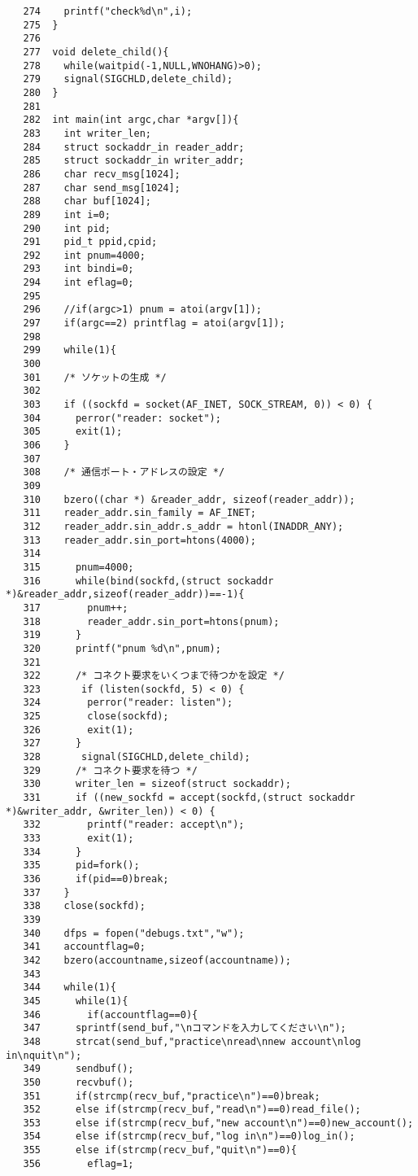 \documentclass[a4j]{jarticle}
\begin{document}
{\begin{verbatim}
   274	  printf("check%d\n",i);
   275	}
   276	
   277	void delete_child(){
   278	  while(waitpid(-1,NULL,WNOHANG)>0);
   279	  signal(SIGCHLD,delete_child);
   280	}
   281	
   282	int main(int argc,char *argv[]){
   283	  int writer_len;
   284	  struct sockaddr_in reader_addr; 
   285	  struct sockaddr_in writer_addr;
   286	  char recv_msg[1024];
   287	  char send_msg[1024];
   288	  char buf[1024];
   289	  int i=0;
   290	  int pid;
   291	  pid_t ppid,cpid;
   292	  int pnum=4000;
   293	  int bindi=0;
   294	  int eflag=0;
   295	
   296	  //if(argc>1) pnum = atoi(argv[1]);
   297	  if(argc==2) printflag = atoi(argv[1]);
   298	
   299	  while(1){
   300	
   301	  /* ソケットの生成 */
   302	
   303	  if ((sockfd = socket(AF_INET, SOCK_STREAM, 0)) < 0) {
   304	    perror("reader: socket");
   305	    exit(1);
   306	  }
   307	
   308	  /* 通信ポート・アドレスの設定 */
   309	
   310	  bzero((char *) &reader_addr, sizeof(reader_addr));
   311	  reader_addr.sin_family = AF_INET;
   312	  reader_addr.sin_addr.s_addr = htonl(INADDR_ANY);
   313	  reader_addr.sin_port=htons(4000);
   314	
   315	    pnum=4000;
   316	    while(bind(sockfd,(struct sockaddr *)&reader_addr,sizeof(reader_addr))==-1){
   317	      pnum++;
   318	      reader_addr.sin_port=htons(pnum);
   319	    }
   320	    printf("pnum %d\n",pnum);
   321	
   322	    /* コネクト要求をいくつまで待つかを設定 */
   323	     if (listen(sockfd, 5) < 0) {
   324	      perror("reader: listen");
   325	      close(sockfd);
   326	      exit(1);
   327	    }
   328	     signal(SIGCHLD,delete_child);
   329	    /* コネクト要求を待つ */
   330	    writer_len = sizeof(struct sockaddr);
   331	    if ((new_sockfd = accept(sockfd,(struct sockaddr *)&writer_addr, &writer_len)) < 0) {
   332	      printf("reader: accept\n");
   333	      exit(1);
   334	    }
   335	    pid=fork();
   336	    if(pid==0)break;
   337	  }
   338	  close(sockfd);
   339	
   340	  dfps = fopen("debugs.txt","w");
   341	  accountflag=0;
   342	  bzero(accountname,sizeof(accountname));
   343	
   344	  while(1){
   345	    while(1){
   346	      if(accountflag==0){
   347		sprintf(send_buf,"\nコマンドを入力してください\n");
   348		strcat(send_buf,"practice\nread\nnew account\nlog in\nquit\n");
   349		sendbuf();
   350		recvbuf();
   351		if(strcmp(recv_buf,"practice\n")==0)break;
   352		else if(strcmp(recv_buf,"read\n")==0)read_file();
   353		else if(strcmp(recv_buf,"new account\n")==0)new_account();
   354		else if(strcmp(recv_buf,"log in\n")==0)log_in();
   355		else if(strcmp(recv_buf,"quit\n")==0){
   356		  eflag=1;

\end{verbatim}}
\end{document}
